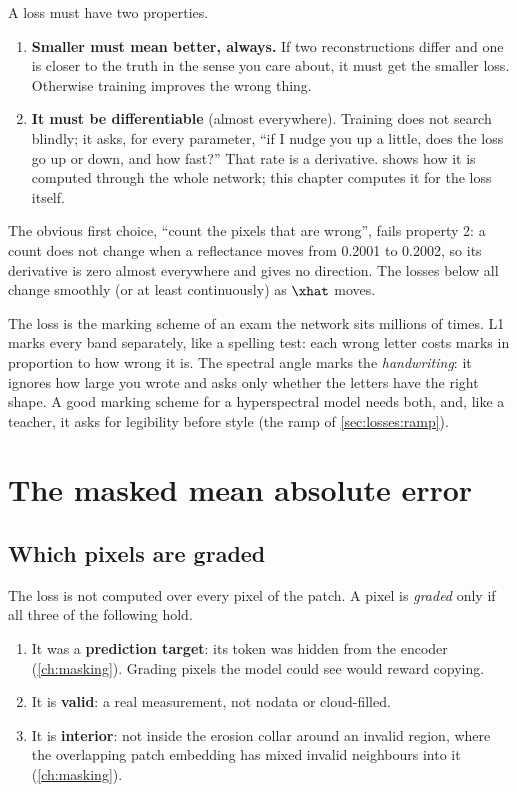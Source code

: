 A loss must have two properties.

\begin{enumerate}
  \item \textbf{Smaller must mean better, always.} If two reconstructions differ and one is
  closer to the truth in the sense you care about, it must get the smaller loss. Otherwise
  training improves the wrong thing.
  \item \textbf{It must be differentiable} (almost everywhere). Training does not search
  blindly; it asks, for every parameter, ``if I nudge you up a little, does the loss go up or
  down, and how fast?'' That rate is a derivative.  shows how it is
  computed through the whole network; this chapter computes it for the loss itself.
\end{enumerate}

The obvious first choice, ``count the pixels that are wrong'', fails property 2: a count does
not change when a reflectance moves from 0.2001 to 0.2002, so its derivative is zero almost
everywhere and gives no direction. The losses below all change smoothly (or at least
continuously) as $\xhat$ moves.

\begin{analogy}
The loss is the marking scheme of an exam the network sits millions of times. L1 marks every
band separately, like a spelling test: each wrong letter costs marks in proportion to how wrong
it is. The spectral angle marks the \emph{handwriting}: it ignores how large you wrote and asks
only whether the letters have the right shape. A good marking scheme for a hyperspectral
model needs both, and, like a teacher, it asks for legibility before style (the ramp of
\cref{sec:losses:ramp}).
\end{analogy}

\section{The masked mean absolute error}\label{sec:losses:l1}

\subsection{Which pixels are graded}

The loss is not computed over every pixel of the patch. A pixel is \emph{graded} only if all
three of the following hold.

\begin{enumerate}
  \item It was a \textbf{prediction target}: its token was hidden from the encoder
  (\cref{ch:masking}). Grading pixels the model could see would reward copying.
  \item It is \textbf{valid}: a real measurement, not nodata or cloud-filled.
  \item It is \textbf{interior}: not inside the erosion collar around an invalid region,
  where the overlapping patch embedding has mixed invalid neighbours into it (\cref{ch:masking}).
\end{enumerate}

